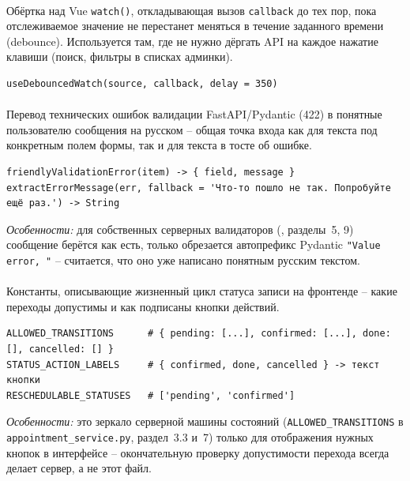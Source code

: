 \paragraph{}
Обёртка над Vue \texttt{watch()}, откладывающая вызов \texttt{callback}
до тех пор, пока отслеживаемое значение не перестанет меняться в течение
заданного времени (debounce). Используется там, где не нужно дёргать API
на каждое нажатие клавиши (поиск, фильтры в списках админки).
\begin{verbatim}
useDebouncedWatch(source, callback, delay = 350)
\end{verbatim}

\paragraph{}
Перевод технических ошибок валидации FastAPI/Pydantic (422) в понятные
пользователю сообщения на русском -- общая точка входа как для текста
под конкретным полем формы, так и для текста в тосте об ошибке.
\begin{verbatim}
friendlyValidationError(item) -> { field, message }
extractErrorMessage(err, fallback = 'Что-то пошло не так. Попробуйте ещё раз.') -> String
\end{verbatim}
\textit{Особенности:} для собственных серверных валидаторов
(, разделы~5, 9) сообщение берётся как
есть, только обрезается автопрефикс Pydantic \texttt{"Value error, "} --
считается, что оно уже написано понятным русским текстом.

\paragraph{}
Константы, описывающие жизненный цикл статуса записи на фронтенде --
какие переходы допустимы и как подписаны кнопки действий.
\begin{verbatim}
ALLOWED_TRANSITIONS      # { pending: [...], confirmed: [...], done: [], cancelled: [] }
STATUS_ACTION_LABELS     # { confirmed, done, cancelled } -> текст кнопки
RESCHEDULABLE_STATUSES   # ['pending', 'confirmed']
\end{verbatim}
\textit{Особенности:} это зеркало серверной машины состояний
(\texttt{ALLOWED_TRANSITIONS} в \texttt{appointment_service.py}, раздел~3.3
и~7) только для отображения нужных кнопок в интерфейсе -- окончательную
проверку допустимости перехода всегда делает сервер, а не этот файл.

